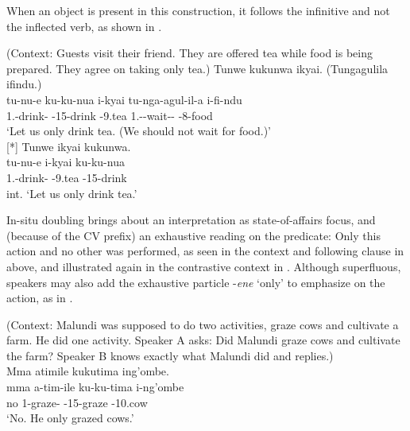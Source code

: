 \documentclass[output=paper]{langscibook}
\begin{document}
\z


When an object is present in this construction, it follows the infinitive and not the inflected verb, as shown in .

\ea
\label{bkm:Ref122523250}(Context: Guests visit their friend. They are offered tea while food is being prepared. They agree on taking only tea.)
\ea
Tunwe kukunwa ikyai. (Tungagulila ifindu.)\\
\gll
tu-nu-e  ku-ku-nua  i-kyai  tu-nga-agul-il-a i-fi-ndu\\
1\PL.\SM{}-drink-\SBJV{}  \EXH{}-15-drink  \AUG{}-9.tea  1\PL.\SM{}-\PROH{}-wait-\APPL-\FV{} \AUG{}-8-food\\
\glt
‘Let us only drink tea. (We should not wait for food.)’\\


\ex
[*]{
Tunwe ikyai kukunwa.\\
\gll
tu-nu-e  i-kyai  ku-ku-nua\\
1\PL.\SM{}-drink-\SBJV{}  \AUG{}-9.tea  \EXH{}-15-drink   \\
\glt
int. ‘Let us only drink tea.’\\
}

\z
\z

In-situ doubling brings about an interpretation as state-of-affairs focus, and (because of the CV prefix) an exhaustive reading on the predicate: Only this action and no other was performed, as seen in the context and following clause in  above, and illustrated again in the contrastive context in . Although superfluous, speakers may also add the exhaustive particle -\textit{ene} ‘only’ to emphasize on the action, as in .

\ea
\label{bkm:Ref122523373}
(Context: Malundi was supposed to do two activities, graze cows and cultivate a farm. He did one activity. Speaker A asks: Did Malundi graze cows and cultivate the farm? Speaker B knows exactly what Malundi did and replies.)\\
Mma atimile kukutima ing’ombe.\\
\gll
mma  a-tim-ile  ku-ku-tima  i-ng’ombe\\
no  1\SM{}-graze-\PFV{}  \EXH{}-15-graze  \AUG{}-10.cow\\
\glt
‘No. He only grazed cows.’\\
\end{document}
